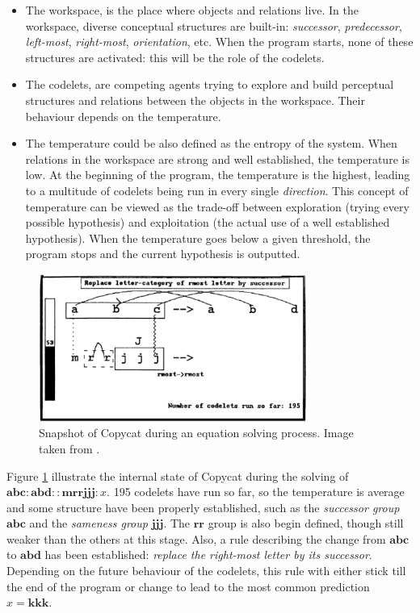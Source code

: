\begin{itemize}
    \item The workspace, is the place where objects and relations live.
      In the workspace, diverse conceptual structures are built-in:
      \textit{successor}, \textit{predecessor}, \textit{left-most},
      \textit{right-most}, \textit{orientation}, etc. When the program starts, none of these
      structures are activated: this will be the role of the codelets.
    \item The codelets, are competing agents trying to explore and build
      perceptual structures and relations between the objects in the workspace.
      Their behaviour depends on the temperature.
    \item The temperature could be also defined as the entropy of the
      system. When relations in the workspace are strong and well established,
      the temperature is low. At the beginning of the program, the temperature
      is the highest, leading to a multitude of codelets being run in every
      single \textit{direction}. This concept of temperature can be viewed as
      the trade-off between exploration (trying every possible hypothesis) and
      exploitation (the actual use of a well established hypothesis). When the
      temperature goes below a given threshold, the program stops and the
      current hypothesis is outputted.
\end{itemize}

\begin{figure}[!h]
\centering
  \includegraphics[width=3.5in]{figures/copycat.png}
\caption{Snapshot of Copycat during an equation solving process. Image taken
  from \cite{Mit01}.}
\label{FIG:copycat_snapshot}
\end{figure}

Figure \ref{FIG:copycat_snapshot} illustrate the internal state of Copycat
during the solving of $\mathbf{abc} : \mathbf{abd} :: \mathbf{mrrjjj}: x$. 195
codelets have run so far, so the temperature is average and some structure have
been properly established, such as the \textit{successor group} $\mathbf{abc}$
and the \textit{sameness group} $\mathbf{jjj}$. The $\mathbf{rr}$ group is also
begin defined, though still weaker than the others at this stage. Also, a rule
describing the change from $\mathbf{abc}$ to $\mathbf{abd}$ has been
established: \textit{replace the right-most letter by its successor}. Depending
on the future behaviour of the codelets, this rule with either stick till the
end of the program or change to lead to the most common prediction $x =
\mathbf{kkk}$.

